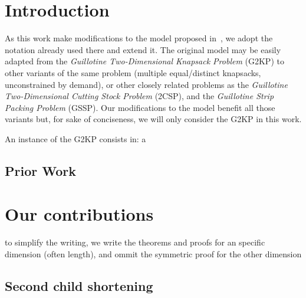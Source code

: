 \documentclass[runningheads]{llncs}
\begin{document}
 
\section{Introduction}


As this work make modifications to the model proposed in~\cite{furini:2016},
we adopt the notation already used there and extend it.
The original model may be easily adapted from the \emph{Guillotine Two-Dimensional Knapsack Problem} (G2KP) to other variants of the same problem (multiple equal/distinct knapsacks, unconstrained by demand), or other closely related problems as the \emph{Guillotine Two-Dimensional Cutting Stock Problem} (2CSP), and the \emph{Guillotine Strip Packing Problem} (GSSP). Our modifications to the model benefit all those variants but, for sake of conciseness, we will only consider the G2KP in this work.

An instance of the G2KP consists in: a


\subsection{Prior Work}


\section{Our contributions}

to simplify the writing, we write the theorems and proofs for an specific dimension (often length), and ommit the symmetric proof for the other dimension

\subsection{Second child shortening}
\end{document}
